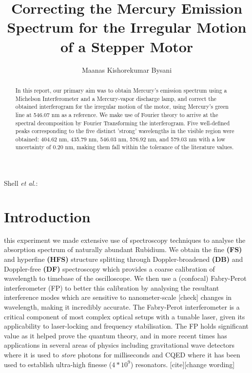 \documentclass[journal]{Imperial_lab_report}
\begin{document}
\title{Correcting the Mercury Emission Spectrum for the Irregular Motion of a Stepper Motor}


\author{Maanas Kishorekumar Bysani}%




{Shell \MakeLowercase{\textit{et al.}}:}


\maketitle


\begin{abstract}
In this report, our primary aim was to obtain Mercury's emission spectrum using a Michelson Interferometer and a Mercury-vapor discharge lamp, and correct the obtained interferogram for the irregular motion of the motor, using Mercury's green line at 546.07 nm as a reference. We make use of Fourier theory to arrive at the spectral decomposition by Fourier Transforming the interferogram. Five well-defined peaks corresponding to the five distinct 'strong' wavelengths in the visible region were obtained: 404.62 nm, 435.79 nm, 546.03 nm, 576.92 nm, and 579.03 nm with a low uncertainty of 0.20 nm, making them fall within the tolerance of the literature values.
\end{abstract}
\vspace{-12pt}


\section{Introduction}
 this experiment we made extensive use of spectroscopy techniques to analyse the absorption spectrum of naturally abundant Rubidium. We obtain the fine \textbf{(FS)} and hyperfine \textbf{(HFS)} structure splitting through Doppler-broadened \textbf{(DB)} and Doppler-free \textbf{(DF)} spectroscopy which provides a coarse calibration of wavelength to timebase of the oscilloscope. We then use a (confocal) Fabry-Perot interferometer (FP) to better this calibration by analysing the resultant interference modes which are sensitive to nanometer-scale [check] changes in wavelength, making it incredibly accurate. The Fabry-Perot interferometer is a critical component of most complex optical setups with a tunable laser, given its applicability to laser-locking and frequency stabilisation. The FP holds significant value as it helped prove the quantum theory, and in more recent times has applications in several areas of physics including gravitational wave detectors where it is used to \textit{store} photons for milliseconds and CQED where it has been used to establish ultra-high finesse ($4*10^9$) resonators. [cite][change wording]
\end{document}
